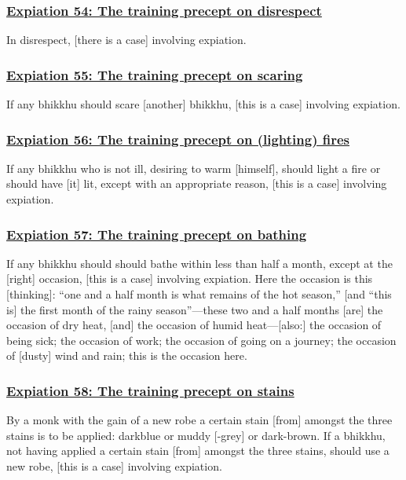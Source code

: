 \subsubsection*{\hyperref[pac54]{Expiation 54: The training precept on disrespect}}
\label{exp54}
In disrespect, [there is a case] involving expiation.

\subsubsection*{\hyperref[pac55]{Expiation 55: The training precept on scaring}}
\label{exp55}
If any bhikkhu should scare [another] bhikkhu, [this is a case] involving expiation.

\subsubsection*{\hyperref[pac56]{Expiation 56: The training precept on (lighting) fires}}
\label{exp56}
If any bhikkhu who is not ill, desiring to warm [himself], should light a fire or should have [it] lit, except with an appropriate reason, [this is a case] involving expiation.

\subsubsection*{\hyperref[pac57]{Expiation 57: The training precept on bathing}}
\label{exp57}
If any bhikkhu should should bathe within less than half a month, except at the [right] occasion, [this is a case] involving expiation. Here the occasion is this [thinking]: ``one and a half month is what remains of the hot season,'' [and ``this is] the first month of the rainy season''—these two and a half months [are] the occasion of dry heat, [and] the occasion of humid heat—[also:] the occasion of being sick; the occasion of work; the occasion of going on a journey; the occasion of [dusty] wind and rain; this is the occasion here.

\subsubsection*{\hyperref[pac58]{Expiation 58: The training precept on stains}}
\label{exp58}
By a monk with the gain of a new robe a certain stain [from] amongst the three stains is to be applied: darkblue or muddy [-grey] or dark-brown. If a bhikkhu, not having applied a certain stain [from] amongst the three stains, should use a new robe, [this is a case] involving expiation.

